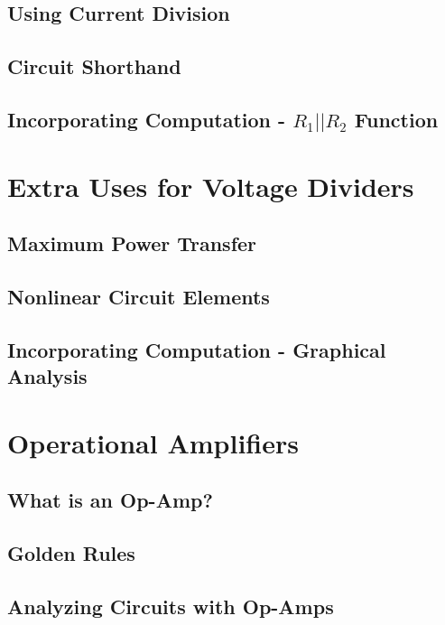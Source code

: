 \documentclass[a4paper,11pt]{book}
\begin{document}
\section{Using Current Division}

\section{Circuit Shorthand}

\section{Incorporating Computation - $R_1||R_2$ Function}


\chapter{Extra Uses for Voltage Dividers}
\section{Maximum Power Transfer}

\section{Nonlinear Circuit Elements}
\section{Incorporating Computation - Graphical Analysis}
\chapter{Operational Amplifiers}
\section{What is an Op-Amp?}

\section{Golden Rules}


\section{Analyzing Circuits with Op-Amps}
\end{document}
